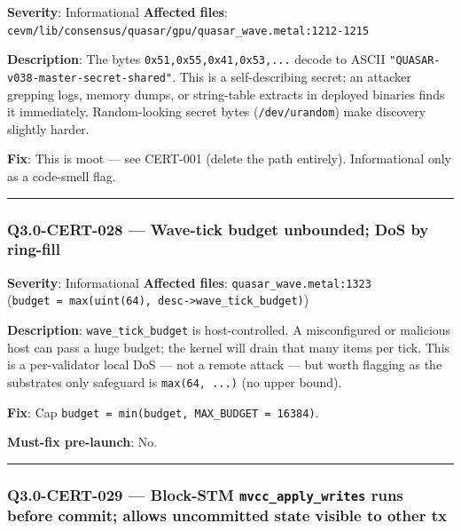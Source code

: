 \documentclass[
]{article}
\begin{document}
\textbf{Severity}: Informational \textbf{Affected files}:
\texttt{cevm/lib/consensus/quasar/gpu/quasar\_wave.metal:1212-1215}

\textbf{Description}: The bytes \texttt{0x51,0x55,0x41,0x53,...} decode
to ASCII \texttt{"QUASAR-v038-master-secret-shared"}. This is a
self-describing secret; an attacker grepping logs, memory dumps, or
string-table extracts in deployed binaries finds it immediately.
Random-looking secret bytes (\texttt{/dev/urandom}) make discovery
slightly harder.

\textbf{Fix}: This is moot --- see CERT-001 (delete the path entirely).
Informational only as a code-smell flag.

\begin{center}\rule{0.5\linewidth}{0.5pt}\end{center}

\subsubsection{Q3.0-CERT-028 --- Wave-tick budget unbounded; DoS by
ring-fill}\label{q30-cert-028--wave-tick-budget-unbounded-dos-by-ring-fill}

\textbf{Severity}: Informational \textbf{Affected files}:
\texttt{quasar\_wave.metal:1323}
(\texttt{budget\ =\ max(uint(64),\ desc-\textgreater{}wave\_tick\_budget)})

\textbf{Description}: \texttt{wave\_tick\_budget} is host-controlled. A
misconfigured or malicious host can pass a huge budget; the kernel will
drain that many items per tick. This is a per-validator local DoS ---
not a remote attack --- but worth flagging as the
substrate\textquotesingle s only safeguard is \texttt{max(64,\ ...)} (no
upper bound).

\textbf{Fix}: Cap
\texttt{budget\ =\ min(budget,\ MAX\_BUDGET\ =\ 16384)}.

\textbf{Must-fix pre-launch}: No.

\begin{center}\rule{0.5\linewidth}{0.5pt}\end{center}

\subsubsection{\texorpdfstring{Q3.0-CERT-029 --- Block-STM
\texttt{mvcc\_apply\_writes} runs before commit; allows uncommitted
state visible to other
tx}{Q3.0-CERT-029 --- Block-STM mvcc\_apply\_writes runs before commit; allows uncommitted state visible to other tx}}\label{q30-cert-029--block-stm-mvcc_apply_writes-runs-before-commit-allows-uncommitted-state-visible-to-other-tx}
\end{document}
